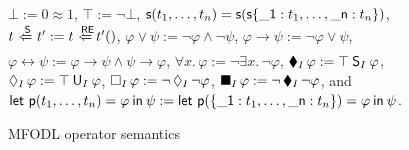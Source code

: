 \begin{figure}
	$\bot := 0 \approx 1$,
	$\top := \neg \bot$,
	$\mathsf{s}(t_1,\ldots,t_n) = \mathsf{s}(\mathsf{s}\{\mathsf{\_1}:t_1,\ldots,\mathsf{\_n}:t_n\})$,
	$t\ \mfodlsubs\ t' := t\ \mfodlmatches\; t'()$,
	$\varphi \lor \psi := \neg \varphi \land \neg \psi$,
	$\varphi \rightarrow \psi := \neg \varphi \vee \psi$,
	$\varphi \leftrightarrow \psi := \varphi \rightarrow \psi \land \psi \rightarrow \varphi$,
	$\forall x.\, \varphi := \neg \exists x.\, \neg \varphi$,
	$\operatorname{\blacklozenge}_I \varphi := \top \mathbin{\mathsf{S}}_I \varphi$,
	$\operatorname{\lozenge}_I \varphi := \top \mathbin{\mathsf{U}}_I \varphi$,
	$\operatorname{\square}_I \varphi := \neg \operatorname{\lozenge}_I \neg \varphi$,
	$\operatorname{\blacksquare}_I \varphi := \neg \operatorname{\blacklozenge}_I \neg \varphi$, and
	$\mathbin{\mathsf{let}} \ \mathsf{p}(t_1,\ldots,t_n) = \varphi \mathbin{\mathsf{in}} \psi := \mathbin{\mathsf{let}} \ \mathsf{p}(\{\mathsf{\_1}:t_1,\ldots,\mathsf{\_n}:t_n\}) = \varphi \mathbin{\mathsf{in}} \psi$.
	\caption{MFODL operator semantics}
	\label{fig:mfodl_operator_semantics}
\end{figure}





